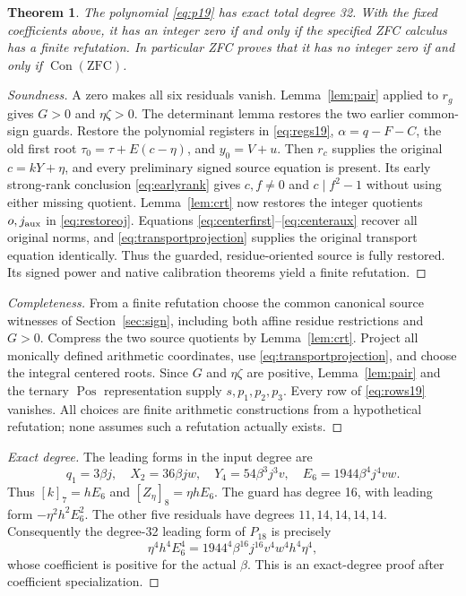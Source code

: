 \documentclass[11pt]{article}
\newtheorem{theorem}{Theorem}[section]
\theoremstyle{remark}\newtheorem{remark}[theorem]{Remark}
\newcommand{\Pos}{\operatorname{Pos}}
\newcommand{\Con}{\operatorname{Con}}
\begin{document}
\begin{theorem}
\label{thm:p19}
The polynomial \eqref{eq:p19} has exact total degree 32. With the
fixed coefficients above, it has an integer zero if and only if the
specified ZFC calculus has a finite refutation. In particular ZFC proves
that it has no integer zero if and only if $\Con(\mathrm{ZFC})$.
\end{theorem}
\begin{proof}[Soundness]
A zero makes all six residuals vanish. Lemma~\ref{lem:pair} applied to
$r_g$ gives $G>0$ and $\eta\zeta>0$. The determinant lemma restores
the two earlier common-sign guards. Restore the polynomial registers in
\eqref{eq:regs19}, $\alpha=q-F-C$, the old first root
$\tau_0=\tau+E(c-\eta)$, and $y_0=V+u$.
Then $r_c$ supplies the original $c=kY+\eta$, and every preliminary
signed source equation is present. Its early strong-rank conclusion
\eqref{eq:earlyrank} gives $c,f\ne0$ and $c\mid f^2-1$ without using
either missing quotient. Lemma~\ref{lem:crt} now restores the integer
quotients $o,j_{\rm aux}$ in \eqref{eq:restoreoj}. Equations
\eqref{eq:centerfirst}--\eqref{eq:centeraux} recover all original norms,
and \eqref{eq:transportprojection} supplies the original transport
equation identically. Thus the guarded,
residue-oriented source is fully restored. Its signed power and native
calibration theorems yield a finite refutation.
\end{proof}
\begin{proof}[Completeness]
From a finite refutation choose the common canonical source witnesses of
Section~\ref{sec:sign}, including both affine residue restrictions and
$G>0$. Compress the two source quotients by Lemma~\ref{lem:crt}.
Project all monically defined arithmetic coordinates, use
\eqref{eq:transportprojection}, and choose the
integral centered roots. Since $G$ and $\eta\zeta$ are positive,
Lemma~\ref{lem:pair} and the ternary $\Pos$ representation supply
$s,p_1,p_2,p_3$. Every row of \eqref{eq:rows19} vanishes. All choices
are finite arithmetic constructions from a hypothetical refutation;
none assumes such a refutation actually exists.
\end{proof}
\begin{proof}[Exact degree]
The leading forms in the input degree are
\[
 q_1=3\beta j,\quad X_2=36\beta jw,\quad
 Y_4=54\beta^3j^3v,\quad E_6=1944\beta^4j^4vw.
\]
Thus $[k]_7=hE_6$ and $[Z_\eta]_8=\eta hE_6$.
The guard has degree 16, with leading form $-\eta^2h^2E_6^2$.
The other five residuals have degrees $11,14,14,14,14$.
Consequently the degree-32 leading form of $P_{18}$ is precisely
\[
 \eta^4h^4E_6^4
 =1944^4\beta^{16}j^{16}v^4w^4h^4\eta^4,
\]
whose coefficient is positive for the actual $\beta$. This is an
exact-degree proof after coefficient specialization.
\end{proof}
\end{document}
